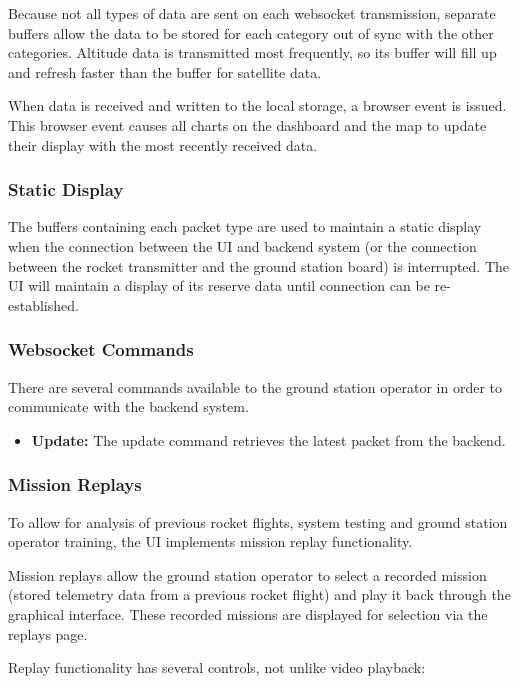Because not all types of data are sent on each websocket transmission, separate buffers allow the data to be stored for each
category out of sync with the other categories. Altitude data is transmitted most frequently, so its buffer will fill up and
refresh faster than the buffer for satellite data.

When data is received and written to the local storage, a browser event is issued. This browser event causes all charts on the
dashboard and the map to update their display with the most recently received data.

\subsubsection{Static Display}

The buffers containing each packet type are used to maintain a static display when the connection between the UI and backend
system (or the connection between the rocket transmitter and the ground station board) is interrupted. The UI will maintain
a display of its reserve data until connection can be re-established.

\subsubsection{Websocket Commands}

There are several commands available to the ground station operator in order to communicate with the backend system.

\begin{itemize}
    \item \textbf{Update:} The update command retrieves the latest packet from the backend.
\end{itemize}

\subsubsection{Mission Replays}

To allow for analysis of previous rocket flights, system testing and ground station operator training, the UI implements 
mission replay functionality.

Mission replays allow the ground station operator to select a recorded mission (stored telemetry data from a previous rocket
flight) and play it back through the graphical interface. These recorded missions are displayed for selection via the replays
page.

Replay functionality has several controls, not unlike video playback:

